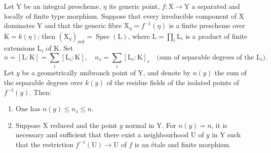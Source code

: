 \begin{theorem}[18.10.16]
\label{IV.18.10.16}
Let $\mathrm{Y}$ be an integral prescheme, $\eta$ its generic point, $f:\mathrm{X}\to\mathrm{Y}$ a separated and locally of finite type morphism.
Suppose that every irreducible component of $\mathrm{X}$ dominates $\mathrm{Y}$ and that the generic fibre $\mathrm{X}_\eta=f^{-1}(\eta)$ is a finite prescheme over $\mathrm{K}=k(\eta)$; then $(\mathrm{X}_\eta)_{\mathrm{red}}=\operatorname{Spec}(\mathrm{L})$, where $\mathrm{L}=\prod_i\mathrm{L}_i$ is a product of finite extensions $\mathrm{L}_i$ of $\mathrm{K}$.
Set
\[
  n=[\mathrm{L}:\mathrm{K}]=\sum_i[\mathrm{L}_i:\mathrm{K}],\quad n_s=\sum_i[\mathrm{L}_i:\mathrm{K}]_s\quad\text{(sum of separable degrees of the $\mathrm{L}_i$)}.
\]
Let $y$ be a geometrically unibranch point of $\mathrm{Y}$, and denote by $n(y)$ the sum of the separable degrees over $k(y)$ of the residue fields of the isolated points of $f^{-1}(y)$.
Then:
\begin{enumerate}[label=(\roman*)]
  \item One has $n(y)\leq n_s\leq n$.
  \item Suppose $\mathrm{X}$ reduced and the point $y$ normal in $\mathrm{Y}$.
For $n(y)=n$, it is necessary and sufficient that there exist a neighbourhood $\mathrm{U}$ of $y$ in $\mathrm{Y}$ such that the restriction $f^{-1}(\mathrm{U})\to\mathrm{U}$ of $f$ is an \'etale and finite morphism.
\end{enumerate}
\end{theorem}


